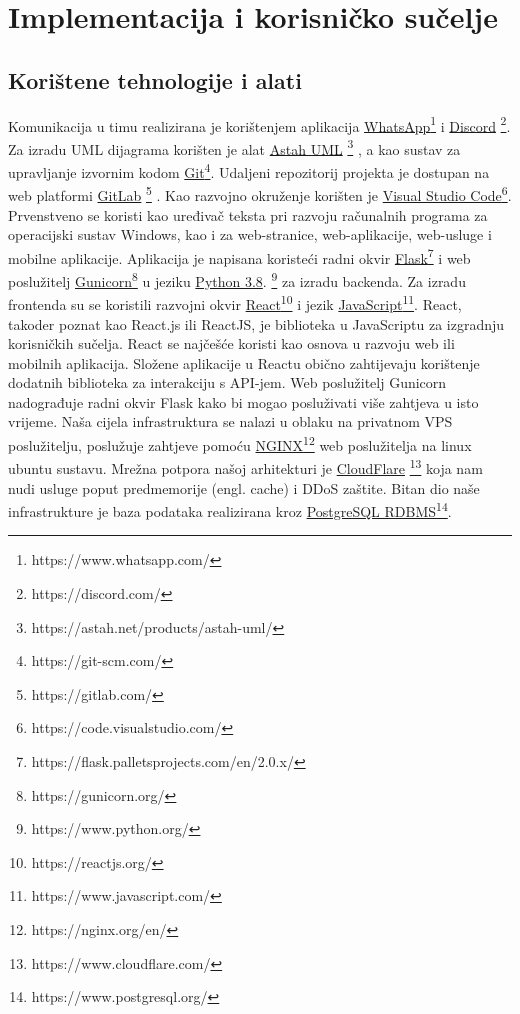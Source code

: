 \chapter{Implementacija i korisničko sučelje}
		
		\section{Korištene tehnologije i alati}
		
			Komunikacija u timu realizirana je korištenjem aplikacija \underline{WhatsApp}\footnote{https://www.whatsapp.com/} i \underline{Discord} \footnote{https://discord.com/}. Za izradu	UML dijagrama korišten je alat \underline{Astah UML} \footnote{https://astah.net/products/astah-uml/}  , a kao sustav za upravljanje izvornim kodom \underline{Git}\footnote{https://git-scm.com/}. Udaljeni repozitorij projekta je dostupan na web platformi \underline{GitLab} \footnote{https://gitlab.com/} .
			Kao razvojno okruženje korišten je \underline{Visual Studio Code}\footnote{https://code.visualstudio.com/}. Prvenstveno se koristi kao uređivač teksta pri razvoju računalnih programa za operacijski sustav Windows, kao i za web-stranice, web-aplikacije, web-usluge i mobilne aplikacije. Aplikacija je napisana koristeći radni okvir \underline{Flask}\footnote{https://flask.palletsprojects.com/en/2.0.x/} i web poslužitelj \underline{Gunicorn}\footnote{https://gunicorn.org/} u jeziku \underline{Python 3.8}. \footnote{https://www.python.org/} za izradu backenda. Za izradu frontenda su se koristili razvojni okvir \underline{React}\footnote{https://reactjs.org/} i jezik \underline{JavaScript}\footnote{https://www.javascript.com/}. React, takoder poznat kao React.js ili ReactJS, je biblioteka u JavaScriptu za izgradnju korisničkih sučelja. React se najčešće koristi kao osnova	u razvoju web ili mobilnih aplikacija. Složene aplikacije u Reactu obično zahtijevaju korištenje dodatnih biblioteka za interakciju s API-jem. Web poslužitelj Gunicorn nadograđuje radni okvir Flask kako bi mogao posluživati više zahtjeva u isto vrijeme. Naša cijela infrastruktura se nalazi u oblaku na privatnom VPS poslužitelju, poslužuje zahtjeve pomoću \underline{NGINX}\footnote{https://nginx.org/en/} web poslužitelja na linux  ubuntu sustavu.
			Mrežna potpora našoj arhitekturi je \underline{CloudFlare} \footnote{https://www.cloudflare.com/} koja nam nudi usluge poput predmemorije (engl. cache) i DDoS zaštite. Bitan dio naše infrastrukture je baza podataka realizirana kroz \underline{PostgreSQL RDBMS}\footnote{https://www.postgresql.org/}.
			
